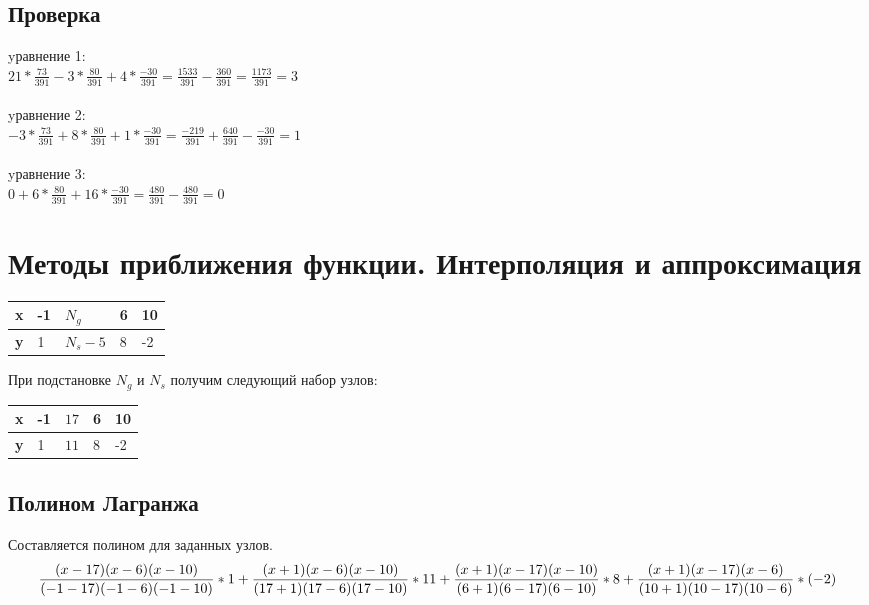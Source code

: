 \documentclass{article}
\begin{document}
\subsection{Проверка}
yравнение 1:\\
$21 * \frac{73}{391} -3*\frac{80}{391} + 4 * \frac{-30}{391}
= \frac{1533}{391} - \frac{360}{391}
= \frac{1173}{391} 
= 3$
\\\\
yравнение 2:\\
$ -3 * \frac{73}{391} + 8*\frac{80}{391} + 1 *\frac{-30}{391}
= \frac{-219}{391} + \frac{640}{391} - \frac{-30}{391}
= 1$
\\\\
yравнение 3:\\
$0 + 6*\frac{80}{391} + 16 *\frac{-30}{391}
= \frac{480}{391} -\frac{480}{391} 
= 0$

\section{Методы приближения функции. Интерполяция и аппроксимация}

\begin{table}[!h]
  \begin{tabular}{|l|l|l|l|l|}
  \hline
  \bfseries x & -1 & $N_{g}$   & 6 & 10\\
  \hline
  \bfseries y &  1 & $N_{s}-5$ & 8 & -2\\
  \hline
  \end{tabular}
\end{table}
При подстановке $N_{g}$ и $N_{s}$ получим следующий набор узлов:
\begin{table}[!h]
  \begin{tabular}{|l|l|l|l|l|}
  \hline
  \bfseries x & -1 & $17$ & 6 & 10\\
  \hline
  \bfseries y &  1 & $11$ & 8 & -2\\
  \hline
  \end{tabular}
\end{table}
 
\subsection{Полином Лагранжа}
Составляется полином для заданных узлов.
\begin{displaymath}
  \frac{(x-17)(x-6)(x-10)}{(-1-17)(-1-6)(-1-10)} *1 +
  \frac{(x+1)(x-6)(x-10)}{(17+1)(17-6)(17-10)} * 11 + \\
  \frac{(x+1)(x-17)(x-10)}{(6+1)(6-17)(6-10)} * 8 + 
  \frac{(x+1)(x-17)(x-6)}{(10+1)(10-17)(10-6)} * (-2)
\end{displaymath}
\end{document}
